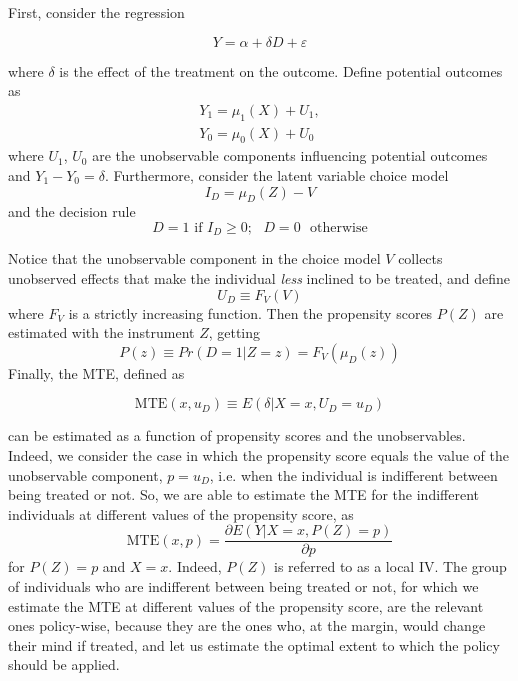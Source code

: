 \documentclass[12pt,a4paper,openright,twoside]{book}
\begin{document}
\begin{doublespacing}
First, consider the regression

\begin{equation}
    Y = \alpha + \delta D + \varepsilon
\end{equation}

where $\delta$ is the effect of the treatment on the outcome. Define potential outcomes as
\begin{equation}
\begin{split}
    Y_1 = \mu_1(X) + U_1,\\
    Y_0 = \mu_0(X) + U_0
\end{split}
\end{equation}
where $U_1$, $U_0$ are the unobservable components influencing potential outcomes and $Y_1 - Y_0 = \delta$. Furthermore, consider the latent variable choice model 
\begin{equation}
    I_D = \mu_D(Z) - V
\end{equation}
and the decision rule 
\begin{equation}
    D = 1 \,\, \text{if}\,\, I_D \ge 0; \,\,\,\, D=0 \,\,\text{ otherwise}
\end{equation}

Notice that the unobservable component in the choice model $V$ collects unobserved effects that make the individual \textit{less} inclined to be treated, and define
\begin{equation}
    U_D \equiv F_V(V)
\end{equation}
where $F_V$ is a strictly increasing function.
Then the propensity scores $P(Z)$ are estimated with the instrument $Z$, getting
\begin{equation}
    P(z) \equiv Pr(D=1 | Z = z) = F_V(\mu_D(z))
\end{equation}
Finally, the MTE, defined as 

\begin{equation}
    \text{MTE} (x, u_D) \equiv E(\delta | X = x, U_D = u_D)
\end{equation}

can be estimated as a function of propensity scores and the unobservables. Indeed, we consider the case in which the propensity score equals the value of the unobservable component, $p = u_D$, i.e. when the individual is indifferent between being treated or not. So, we are able to estimate the MTE for the indifferent individuals at different values of the propensity score, as
\begin{equation}
   \text{MTE} (x, p) = \frac{\partial E(Y|X = x,P(Z) = p)}{\partial p} 
\end{equation}
for $P(Z) = p$ and $X=x$. Indeed, $P(Z)$ is referred to as a local IV. The group of individuals who are indifferent between being treated or not, for which we estimate the MTE at different values of the propensity score, are the relevant ones policy-wise, because they are the ones who, at the margin, would change their mind if treated, and let us estimate the optimal extent to which the policy should be applied. \\


\end{doublespacing}
\end{document}

